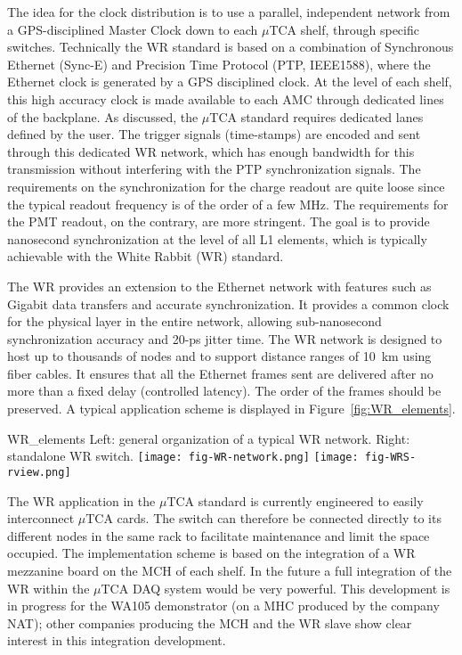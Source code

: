 The idea for the clock distribution is to use a parallel, independent
network from a GPS-disciplined Master Clock down to each $\mu$TCA
shelf, through specific switches. Technically the WR standard is based
on a combination of Synchronous Ethernet (Sync-E) and Precision Time
Protocol (PTP, IEEE1588), where the Ethernet clock is generated by a
GPS disciplined clock. At the level of each shelf, this high accuracy
clock is made available to each AMC through dedicated lines of
the backplane. As discussed, the $\mu$TCA standard %
requires dedicated lanes defined by the user. The trigger signals
(time-stamps) are encoded and sent through this dedicated WR network,
which has enough bandwidth for this transmission without interfering
with the PTP synchronization signals. The requirements on the
synchronization for the charge readout are quite loose since the
typical readout frequency is of the order of a few MHz. The
requirements for the PMT readout, on the contrary, are more
stringent. The goal is to provide nanosecond synchronization at the
level of all L1 elements, which is typically achievable with the
White Rabbit (WR) standard\cite{WR-standard}.

The WR provides an extension to the Ethernet network with features such as Gigabit data
transfers and accurate synchronization. %
It provides a common clock for the physical layer in the entire
network, allowing sub-nanosecond synchronization accuracy and 20-ps
jitter time. The WR network is designed to host up to thousands of
nodes and to support distance ranges of 10~km using fiber cables. It
ensures that all the Ethernet frames sent are delivered %
after no more than a fixed delay 
 (controlled latency). The order of the frames should be
preserved.  A typical application scheme is displayed
in Figure~\ref{fig:WR_elements}.
\begin{cdrfigure}{WR_elements}
{\small Left: general organization of a typical WR network. Right: standalone WR switch.}
\texttt{[image: fig-WR-network.png]}
\texttt{[image: fig-WRS-rview.png]}
\end{cdrfigure}

The WR application in the $\mu$TCA standard is currently engineered %
to easily interconnect %
$\mu$TCA cards. %
The  switch
can therefore be connected directly to its different nodes in the same
rack to facilitate %
maintenance and limit the space occupied. %
The implementation scheme is based on the integration of a WR mezzanine board on the MCH
of each shelf. 
In the future %
a full integration of the WR
within the $\mu$TCA DAQ system would be very powerful. %
This development is in progress for the WA105
demonstrator (on a MHC produced by the company NAT); other companies
producing the MCH and the WR slave show clear interest in this integration development.
